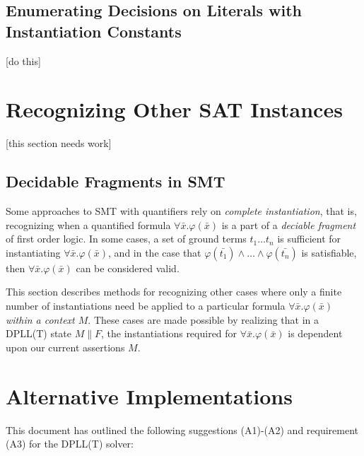 \documentclass{llncs}
\begin{document}
\subsection{Enumerating Decisions on Literals with Instantiation Constants}

[do this]

\section{Recognizing Other SAT Instances}

[this section needs work]

\subsection{Decidable Fragments in SMT}

Some approaches to SMT with quantifiers rely on \emph{complete instantiation}, that is, recognizing when a quantified formula $\forall \bar{ x }. \varphi( \bar{ x } )$ is a part of a \emph{deciable fragment} of first order logic.
In some cases, a set of ground terms $t_1 \ldots t_n$ is sufficient for instantiating $\forall \bar{ x }. \varphi( \bar{ x } )$, and in the case that $\varphi( \bar{ t_1 } ) \wedge \ldots \wedge \varphi( \bar{ t_n } )$ is satisfiable, then $\forall \bar{ x }. \varphi( \bar{ x } )$ can be considered valid.

This section describes methods for recognizing other cases where only a finite number of instantiations need be applied to a particular formula $\forall \bar{ x }. \varphi( \bar{ x } )$ \emph{within a context $M$}.
These cases are made possible by realizing that in a DPLL(T) state $M \parallel F$, the instantiations required for $\forall \bar{ x }. \varphi( \bar{ x } )$ is dependent upon our current assertions $M$.

\section{Alternative Implementations}
\label{sec:implementation}

This document has outlined the following suggestions (A1)-(A2) and requirement (A3) for the DPLL(T) solver: \\
\end{document}
